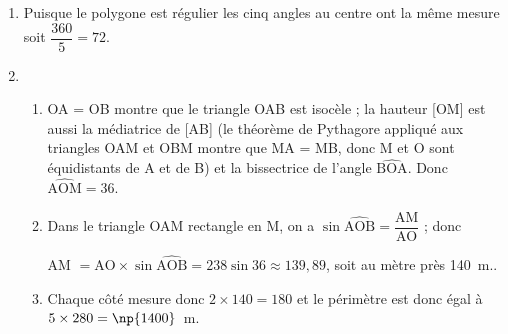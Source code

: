 
\medskip 

% 
% 

\medskip

\begin{enumerate}
\item %
Puisque le polygone est régulier les cinq angles au centre ont la même mesure soit $\dfrac{360}{5} = 72$\degres. 
\item %
	\begin{enumerate}
		\item %
OA = OB montre que le triangle OAB est isocèle  ; la hauteur [OM] est aussi la médiatrice de [AB] (le théorème de Pythagore appliqué aux triangles OAM et OBM montre que MA = MB, donc M et O sont équidistants de A et de B) et la bissectrice de l'angle $\widehat{\text{BOA}}$. 
Donc $\widehat{\text{AOM}} = 36$\degres.
		\item %
		Dans le triangle OAM rectangle en M, on a $\sin \widehat{\text{AOB}} = \dfrac{\text{AM}}{\text{AO}}$ ; donc 
		
AM $ =  {\text{AO}} \times \sin \widehat{\text{AOB}} = 238 \sin 36 \approx 139,89$, soit au mètre près 140~m..
		\item %
		Chaque côté mesure donc $2 \times 140 = 180$ et le périmètre est donc égal à $5 \times 280 = \np{1400}$~m.
	\end{enumerate}
\end{enumerate}
 
\bigskip

